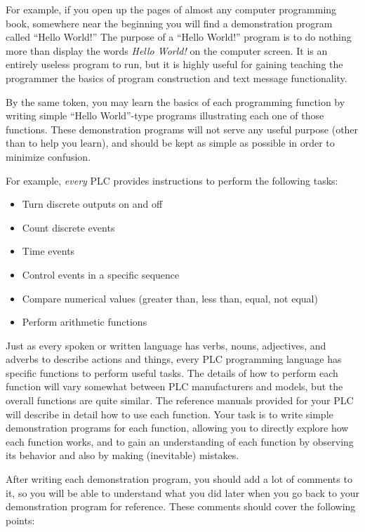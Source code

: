 For example, if you open up the pages of almost any computer programming book, somewhere near the beginning you will find a demonstration program called ``Hello World!''  The purpose of a ``Hello World!'' program is to do nothing more than display the words \textit{Hello World!} on the computer screen.  It is an entirely useless program to run, but it is highly useful for gaining teaching the programmer the basics of program construction and text message functionality.  

By the same token, you may learn the basics of each programming function by writing simple ``Hello World''-type programs illustrating each one of those functions.  These demonstration programs will not serve any useful purpose (other than to help you learn), and should be kept as simple as possible in order to minimize confusion.

For example, \textit{every} PLC provides instructions to perform the following tasks:

\begin{itemize}
\item Turn discrete outputs on and off
\item Count discrete events
\item Time events
\item Control events in a specific sequence
\item Compare numerical values (greater than, less than, equal, not equal)
\item Perform arithmetic functions
\end{itemize}

Just as every spoken or written language has verbs, nouns, adjectives, and adverbs to describe actions and things, every PLC programming language has specific functions to perform useful tasks.  The details of how to perform each function will vary somewhat between PLC manufacturers and models, but the overall functions are quite similar.  The reference manuals provided for your PLC will describe in detail how to use each function.  Your task is to write simple demonstration programs for each function, allowing you to directly explore how each function works, and to gain an understanding of each function by observing its behavior and also by making (inevitable) mistakes.

After writing each demonstration program, you should add a lot of comments to it, so you will be able to understand what you did later when you go back to your demonstration program for reference.  These comments should cover the following points:

